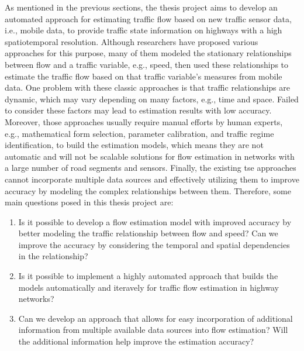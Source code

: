 \documentclass[english]{kththesis}
\begin{document}
As mentioned in the previous sections, the thesis project aims to develop an automated approach for estimating traffic flow based on new traffic sensor data, i.e., mobile data, to provide traffic state information on highways with a high spatiotemporal resolution. Although researchers have proposed various approaches for this purpose, many of them modeled the stationary relationships between flow and a traffic variable, e.g., speed, then used these relationships to estimate the traffic flow based on that traffic variable's measures from mobile data. One problem with these classic approaches is that traffic relationships are dynamic, which may vary depending on many factors, e.g., time and space. Failed to consider these factors may lead to estimation results with low accuracy. Moreover, those approaches usually require manual efforts by human experts, e.g., mathematical form selection, parameter calibration, and traffic regime identification, to build the estimation models, which means they are not automatic and will not be scalable solutions for flow estimation in networks with a large number of road segments and sensors. Finally, the existing \gls{tse} approaches cannot incorporate multiple data sources and effectively utilizing them to improve accuracy by modeling the complex relationships between them. Therefore, some main questions posed in this thesis project are:
\begin{enumerate}
    \item Is it possible to develop a flow estimation model with improved accuracy by better modeling the traffic relationship between flow and speed? Can we improve the accuracy by considering the temporal and spatial dependencies in the relationship?
    \item Is it possible to implement a highly automated approach that builds the models automatically and iteravely for traffic flow estimation in highway networks?
    \item Can we develop an approach that allows for easy incorporation of additional information from multiple available data sources into flow estimation? Will the additional information help improve the estimation accuracy?
\end{enumerate}
\end{document}
